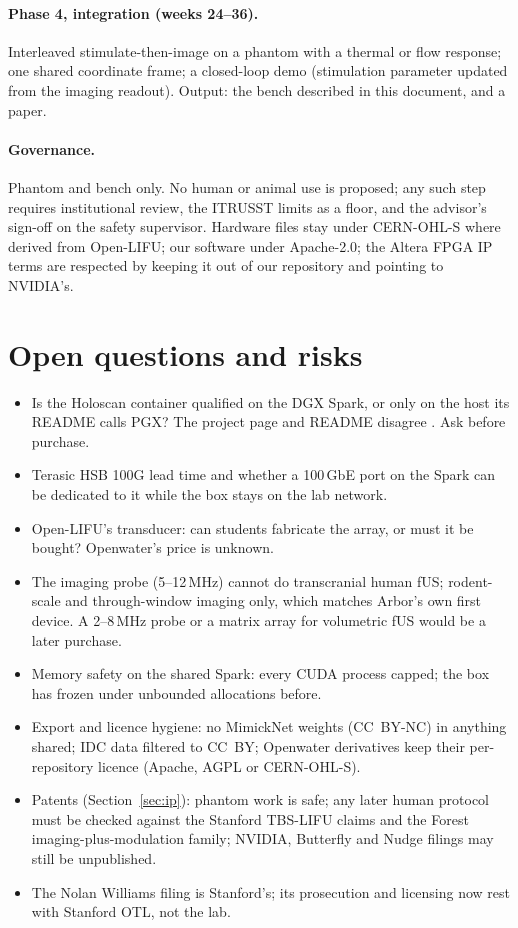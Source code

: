 \documentclass[11pt,a4paper]{article}
\begin{document}
\paragraph{Phase 4, integration (weeks 24--36).} Interleaved stimulate-then-image on a phantom with a thermal or flow response; one shared coordinate frame; a closed-loop demo (stimulation parameter updated from the imaging readout). Output: the bench described in this document, and a paper.

\paragraph{Governance.} Phantom and bench only. No human or animal use is proposed; any such step requires institutional review, the ITRUSST limits as a floor, and the advisor's sign-off on the safety supervisor. Hardware files stay under CERN-OHL-S where derived from Open-LIFU; our software under Apache-2.0; the Altera FPGA IP terms are respected by keeping it out of our repository and pointing to NVIDIA's.

\section{Open questions and risks}
\begin{itemize}[leftmargin=*,nosep]
\item Is the Holoscan container qualified on the DGX Spark, or only on the host its README calls PGX? The project page and README disagree \cite{holoscan}. Ask before purchase.
\item Terasic HSB 100G lead time and whether a 100\,GbE port on the Spark can be dedicated to it while the box stays on the lab network.
\item Open-LIFU's transducer: can students fabricate the array, or must it be bought? Openwater's price is unknown.
\item The imaging probe (5--12\,MHz) cannot do transcranial human fUS; rodent-scale and through-window imaging only, which matches Arbor's own first device. A 2--8\,MHz probe or a matrix array for volumetric fUS would be a later purchase.
\item Memory safety on the shared Spark: every CUDA process capped; the box has frozen under unbounded allocations before.
\item Export and licence hygiene: no MimickNet weights (CC~BY-NC) in anything shared; IDC data filtered to CC~BY; Openwater derivatives keep their per-repository licence (Apache, AGPL or CERN-OHL-S).
\item Patents (Section~\ref{sec:ip}): phantom work is safe; any later human protocol must be checked against the Stanford TBS-LIFU claims and the Forest imaging-plus-modulation family; NVIDIA, Butterfly and Nudge filings may still be unpublished.
\item The Nolan Williams filing is Stanford's; its prosecution and licensing now rest with Stanford OTL, not the lab.
\end{itemize}
\end{document}
